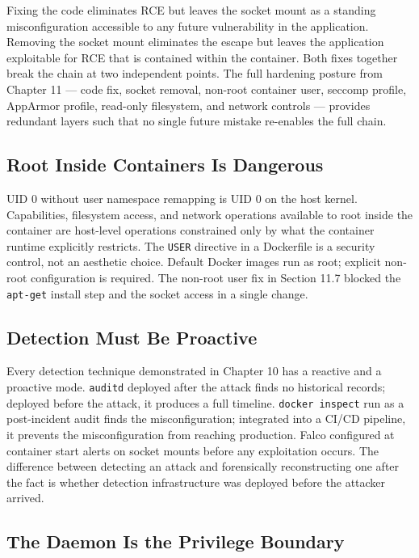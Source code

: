 Fixing the code eliminates RCE but leaves the socket mount as a standing misconfiguration accessible to any future vulnerability in the application. Removing the socket mount eliminates the escape but leaves the application exploitable for RCE that is contained within the container. Both fixes together break the chain at two independent points. The full hardening posture from Chapter 11 --- code fix, socket removal, non-root container user, seccomp profile, AppArmor profile, read-only filesystem, and network controls --- provides redundant layers such that no single future mistake re-enables the full chain.

\subsection{Root Inside Containers Is Dangerous}

UID 0 without user namespace remapping is UID 0 on the host kernel. Capabilities, filesystem access, and network operations available to root inside the container are host-level operations constrained only by what the container runtime explicitly restricts. The \texttt{USER} directive in a Dockerfile is a security control, not an aesthetic choice. Default Docker images run as root; explicit non-root configuration is required. The non-root user fix in Section 11.7 blocked the \texttt{apt-get} install step and the socket access in a single change.

\subsection{Detection Must Be Proactive}

Every detection technique demonstrated in Chapter 10 has a reactive and a proactive mode. \texttt{auditd} deployed after the attack finds no historical records; deployed before the attack, it produces a full timeline. \texttt{docker inspect} run as a post-incident audit finds the misconfiguration; integrated into a CI/CD pipeline, it prevents the misconfiguration from reaching production. Falco configured at container start alerts on socket mounts before any exploitation occurs. The difference between detecting an attack and forensically reconstructing one after the fact is whether detection infrastructure was deployed before the attacker arrived.

\subsection{The Daemon Is the Privilege Boundary}


